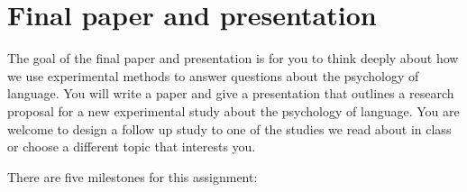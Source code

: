 \documentclass[
  letterpaper,
  DIV=11,
  numbers=noendperiod]{scrreprt}
\begin{document}
\hypertarget{final-paper-and-presentation}{%
\chapter*{Final paper and
presentation}\label{final-paper-and-presentation}}


The goal of the final paper and presentation is for you to think deeply
about how we use experimental methods to answer questions about the
psychology of language. You will write a paper and give a presentation
that outlines a research proposal for a new experimental study about the
psychology of language. You are welcome to design a follow up study to
one of the studies we read about in class or choose a different topic
that interests you.

There are five milestones for this assignment:
\end{document}
